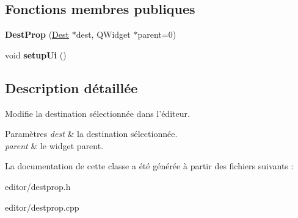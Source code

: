\subsection*{Fonctions membres publiques}
\begin{DoxyCompactItemize}
\item 
\hypertarget{classDestProp_accf41a3f4a376030696fca6daff74cff}{{\bfseries Dest\+Prop} (\hyperlink{classDest}{Dest} $\ast$dest, Q\+Widget $\ast$parent=0)}\label{classDestProp_accf41a3f4a376030696fca6daff74cff}

\item 
\hypertarget{classDestProp_a41ab256b3cb0fe805f1078d232802439}{void {\bfseries setup\+Ui} ()}\label{classDestProp_a41ab256b3cb0fe805f1078d232802439}

\end{DoxyCompactItemize}


\subsection{Description détaillée}
Modifie la destination sélectionnée dans l’éditeur. 


\begin{DoxyParams}{Paramètres}
{\em dest} & la destination sélectionnée. \\
\hline
{\em parent} & le widget parent. \\
\hline
\end{DoxyParams}


La documentation de cette classe a été générée à partir des fichiers suivants \+:\begin{DoxyCompactItemize}
\item 
editor/destprop.\+h\item 
editor/destprop.\+cpp\end{DoxyCompactItemize}
